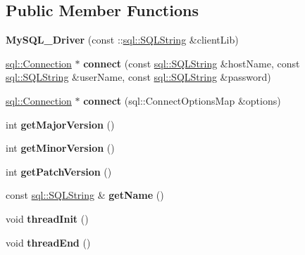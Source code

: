 \subsection*{Public Member Functions}
\begin{DoxyCompactItemize}
\item 
\hypertarget{classsql_1_1mysql_1_1_my_s_q_l___driver_a9fb0b703cfe41e14c9119a5445eb5abd}{}\label{classsql_1_1mysql_1_1_my_s_q_l___driver_a9fb0b703cfe41e14c9119a5445eb5abd} 
{\bfseries My\+S\+Q\+L\+\_\+\+Driver} (const \+::\hyperlink{classsql_1_1_s_q_l_string}{sql\+::\+S\+Q\+L\+String} \&client\+Lib)
\item 
\hypertarget{classsql_1_1mysql_1_1_my_s_q_l___driver_aa04c5abeb14fdcc975b8102ea3b50da2}{}\label{classsql_1_1mysql_1_1_my_s_q_l___driver_aa04c5abeb14fdcc975b8102ea3b50da2} 
\hyperlink{classsql_1_1_connection}{sql\+::\+Connection} $\ast$ {\bfseries connect} (const \hyperlink{classsql_1_1_s_q_l_string}{sql\+::\+S\+Q\+L\+String} \&host\+Name, const \hyperlink{classsql_1_1_s_q_l_string}{sql\+::\+S\+Q\+L\+String} \&user\+Name, const \hyperlink{classsql_1_1_s_q_l_string}{sql\+::\+S\+Q\+L\+String} \&password)
\item 
\hypertarget{classsql_1_1mysql_1_1_my_s_q_l___driver_a3115896b0002e58542b671c54cbf4fd0}{}\label{classsql_1_1mysql_1_1_my_s_q_l___driver_a3115896b0002e58542b671c54cbf4fd0} 
\hyperlink{classsql_1_1_connection}{sql\+::\+Connection} $\ast$ {\bfseries connect} (sql\+::\+Connect\+Options\+Map \&options)
\item 
\hypertarget{classsql_1_1mysql_1_1_my_s_q_l___driver_a18ad292b17b6e55f42aac77f55fcc60f}{}\label{classsql_1_1mysql_1_1_my_s_q_l___driver_a18ad292b17b6e55f42aac77f55fcc60f} 
int {\bfseries get\+Major\+Version} ()
\item 
\hypertarget{classsql_1_1mysql_1_1_my_s_q_l___driver_acb105dd8eda7a255f92dde830dbf9379}{}\label{classsql_1_1mysql_1_1_my_s_q_l___driver_acb105dd8eda7a255f92dde830dbf9379} 
int {\bfseries get\+Minor\+Version} ()
\item 
\hypertarget{classsql_1_1mysql_1_1_my_s_q_l___driver_accfffb055fedaae4f29f0df9c017c229}{}\label{classsql_1_1mysql_1_1_my_s_q_l___driver_accfffb055fedaae4f29f0df9c017c229} 
int {\bfseries get\+Patch\+Version} ()
\item 
\hypertarget{classsql_1_1mysql_1_1_my_s_q_l___driver_a79a72cba4218175ed7044b34619eb1f6}{}\label{classsql_1_1mysql_1_1_my_s_q_l___driver_a79a72cba4218175ed7044b34619eb1f6} 
const \hyperlink{classsql_1_1_s_q_l_string}{sql\+::\+S\+Q\+L\+String} \& {\bfseries get\+Name} ()
\item 
\hypertarget{classsql_1_1mysql_1_1_my_s_q_l___driver_a36f80c3744c40034a2cbad72619021c6}{}\label{classsql_1_1mysql_1_1_my_s_q_l___driver_a36f80c3744c40034a2cbad72619021c6} 
void {\bfseries thread\+Init} ()
\item 
\hypertarget{classsql_1_1mysql_1_1_my_s_q_l___driver_adcf58599e9e55017d00057029b910a24}{}\label{classsql_1_1mysql_1_1_my_s_q_l___driver_adcf58599e9e55017d00057029b910a24} 
void {\bfseries thread\+End} ()
\end{DoxyCompactItemize}
